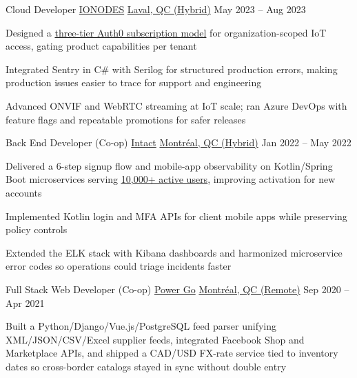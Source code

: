 \begin{cventries}
\cventry
{Cloud Developer} %
{\href{https://www.ionodes.com/}{IONODES}} %
{\href{https://www.google.com/maps/search/?api=1\&query=Laval,+QC,+Canada}{Laval, QC (Hybrid)}} %
{May 2023 -- Aug 2023} %
{
\begin{cvitems}
\item {Designed a \uline{three-tier Auth0 subscription model} for organization-scoped IoT access, gating product capabilities per tenant}
\item {Integrated Sentry in C\# with Serilog for structured production errors, making production issues easier to trace for support and engineering}
\item {Advanced ONVIF and WebRTC streaming at IoT scale; ran Azure DevOps with feature flags and repeatable promotions for safer releases}
\end{cvitems}
}

\cventry
{Back End Developer (Co-op)} %
{\href{https://www.intact.ca/}{Intact}} %
{\href{https://www.google.com/maps/search/?api=1\&query=Montreal,+QC,+Canada}{Montréal, QC (Hybrid)}} %
{Jan 2022 -- May 2022} %
{
\begin{cvitems}
\item {Delivered a 6-step signup flow and mobile-app \mbox{observability} on Kotlin/Spring Boot microservices serving \href{https://www.intact.ca/en/personal-insurance/online-services/mobile-app}{\uline{10,000+ active users}}, improving activation for new accounts}
\item {Implemented Kotlin login and MFA APIs for client mobile apps while preserving policy controls}
\item {Extended the ELK stack with Kibana dashboards and harmonized microservice error codes so operations could triage incidents faster}
\end{cvitems}
}

\cventry
{Full Stack Web Developer (Co-op)} %
{\href{https://www.powergo.ca/}{Power Go}} %
{\href{https://www.google.com/maps/search/?api=1\&query=Montreal,+QC,+Canada}{Montréal, QC (Remote)}} %
{Sep 2020 -- Apr 2021} %
{
\begin{cvitems}
\item {Built a Python/Django/Vue.js/PostgreSQL feed parser unifying XML/JSON/CSV/Excel supplier feeds, integrated Facebook Shop and Marketplace APIs, and shipped a CAD/USD FX-rate service tied to inventory dates so cross-border catalogs stayed in sync without double entry}
\end{cvitems}
}


\end{cventries}
